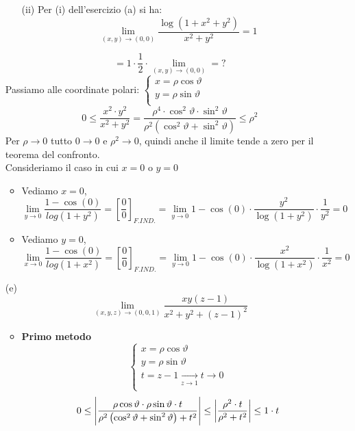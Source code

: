 \begin{eexercise}
\begin{enumerate}
\begin{itemize}
              \item[(ii)] Per (i) dell'esercizio (a) si ha: $$\lim_{(x,y)\to (0,0)}\frac{\log(1+x^2+y^2)}{x^2+y^2} = 1$$
            \end{itemize}
            $$= 1 \cdot \frac{1}{2} \cdot \lim_{(x,y)\to (0,0)} = ?$$
            Passiamo alle coordinate polari: $\left\{\begin{array}{c}
              x = \rho \cos\vartheta \\
              y = \rho \sin\vartheta \\
            \end{array}\right.$
            $$0 \leq \frac{x^2\cdot y^2}{x^2+y^2} = \frac{\rho^4 \cdot \cos^2\vartheta \cdot \sin^2 \vartheta}{\rho^2 \left(\cos^2\vartheta + \sin^2 \vartheta\right)} \leq \rho^2$$
            Per $\rho \to 0$ tutto $0 \to 0$ e $\rho^2 \to 0$, quindi anche il limite tende a zero per il teorema del confronto. \\
            Consideriamo il caso in cui $x = 0$ o $y = 0$
            \begin{itemize}
              \item Vediamo $x = 0$, 
                    $$\lim_{y\to 0} \frac{1-\cos(0)}{log(1+y^2)} = \left[\frac{0}{0}\right]_{F.IND.} = \lim_{y\to 0} 1 - \cos(0) \cdot \frac{y^2}{\log(1+y^2)}  \cdot \frac{1}{y^2} = 0$$
              \item Vediamo $y = 0$, 
                    $$\lim_{x\to 0} \frac{1-\cos(0)}{log(1+x^2)} = \left[\frac{0}{0}\right]_{F.IND.} = \lim_{y\to 0} 1 - \cos(0) \cdot \frac{x^2}{\log(1+x^2)}  \cdot \frac{1}{x^2} = 0$$
            \end{itemize}
    \item[(e)] $$\lim_{(x,y,z)\to (0,0,1)} \frac{xy(z-1)}{x^2+y^2+(z-1)^2}$$
              \begin{itemize}
                \item \textbf{Primo metodo}
                      $$\left\{\begin{array}{l}
                        x = \rho \cos\vartheta \\
                        y = \rho \sin\vartheta \\
                        t = z-1 \xrightarrow[z\to 1]{} t \to 0 \\
                      \end{array}\right.$$
                      $$0\leq \left\lvert \frac{\rho\cos\vartheta\cdot\rho\sin\vartheta \cdot t}{\rho^2\left(\cos^2\vartheta + \sin^2 \vartheta\right) + t^2} \right\rvert \leq \left\lvert \frac{\rho^2\cdot t}{\rho^2+t^2} \right\rvert \leq 1 \cdot t$$

\end{itemize}
\end{enumerate}
\end{eexercise}
